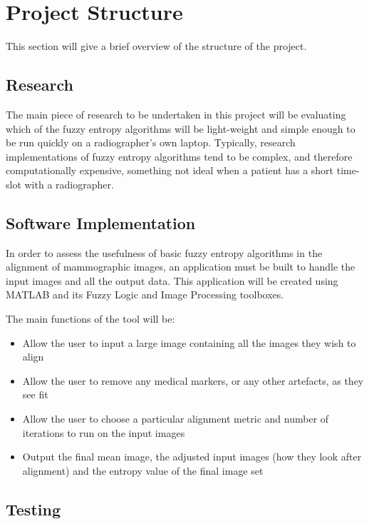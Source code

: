 \section{Project Structure}

This section will give a brief overview of the structure of the project.

\subsection{Research}

The main piece of research to be undertaken in this project will be evaluating which of the fuzzy entropy algorithms will be light-weight and simple enough to be run quickly on a radiographer's own laptop. Typically, research implementations of fuzzy entropy algorithms tend to be complex, and therefore computationally expensive, something not ideal when a patient has a short time-slot with a radiographer.

\subsection{Software Implementation}

In order to assess the usefulness of basic fuzzy entropy algorithms in the alignment of mammographic images, an application must be built to handle the input images and all the output data. This application will be created using MATLAB \cite{MATLAB:2016} and its Fuzzy Logic \cite{fuzzy_toolbox} and Image Processing \cite{image_toolbox} toolboxes.

The main functions of the tool will be:

\begin{itemize}
  \item Allow the user to input a large image containing all the images they wish to align
  \item Allow the user to remove any medical markers, or any other artefacts, as they see fit
  \item Allow the user to choose a particular alignment metric and number of iterations to run on the input images
  \item Output the final mean image, the adjusted input images (how they look after alignment) and the entropy value of the final image set
\end{itemize}

\subsection{Testing}

